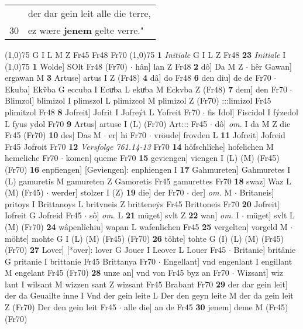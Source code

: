 \documentclass[8pt,a4paper,notitlepage]{article}
\begin{document}
\begin{table}[ht]
\begin{minipage}[t]{0.5\linewidth}
\begin{tabular}{rl}
 & der dar gein leit alle die terre,\\ 
30 & ez wære \textbf{jenem} gelte verre."\\ 
\end{tabular}
\scriptsize
\line(1,0){75} \newline
G I L M Z Fr45 Fr48 Fr70 \newline
\line(1,0){75} \newline
\textbf{1} \textit{Initiale} G I L Z Fr48  \textbf{23} \textit{Initiale} I  \newline
\line(1,0){75} \newline
\textbf{1} Wolde] SOlt Fr48 (Fr70)  $\cdot$ hân] lan Z Fr48 \textbf{2} dô] Da M Z  $\cdot$ hêr Gawan] ergawan M \textbf{3} Artuse] artus I Z (Fr48) \textbf{4} dâ] do Fr48 \textbf{6} den diu] de de Fr70  $\cdot$ Ekuba] Ekv̂ba G eccuba I Ecuͯba L ekuͯba M Eckvba Z (Fr48) \textbf{7} dem] den Fr70  $\cdot$ Blimzol] blimizol I plimszol L plimizcol M plimizol Z (Fr70) :::limizol Fr45 plimitzol Fr48 \textbf{8} Jofreit] Jofrit I Jofreýt L Yofreit Fr70  $\cdot$ fis Idol] Fiscidol I fýzedol L fyus ydol Fr70 \textbf{9} Artus] artuse I (L) (Fr70) Art::: Fr45  $\cdot$ dô] \textit{om.} I da M Z die Fr45 (Fr70) \textbf{10} des] Das M  $\cdot$ er] hi Fr70  $\cdot$ vröude] frovden L \textbf{11} Jofreit] Jofreid Fr45 Jofroit Fr70 \textbf{12} \textit{Versfolge 761.14-13} Fr70  \textbf{14} höfschlîche] hofelichen M hemeliche Fr70  $\cdot$ komen] queme Fr70 \textbf{15} geviengen] viengen I (L) (M) (Fr45) (Fr70) \textbf{16} enpfiengen] [Geviengen]: enphiengen I \textbf{17} Gahmureten] Gahmuretes I (L) gamuretis M gamureten Z Gamoretis Fr45 gamurettes Fr70 \textbf{18} swaz] Waz L (M) (Fr45)  $\cdot$ werder] stolzer I (Z) \textbf{19} die] der Fr70  $\cdot$ der] \textit{om.} M  $\cdot$ Britaneis] pritoys I Brittanoys L britvneis Z britteneẏs Fr45 Brittoneis Fr70 \textbf{20} Jofreit] Iofreit G Jofreid Fr45  $\cdot$ sô] \textit{om.} L \textbf{21} müget] svlt Z \textbf{22} wan] \textit{om.} I  $\cdot$ müget] svlt L (M) (Fr70) \textbf{24} wâpenlîchiu] wapan L wafenlichen Fr45 \textbf{25} vergelten] vorgeld M  $\cdot$ möhte] mohte G I (L) (M) (Fr45) (Fr70) \textbf{26} töhte] tohte G (I) (L) (M) (Fr45) (Fr70) \textbf{27} Lover] [*over]: lover G Jouer I Leover L Louer Fr45  $\cdot$ Britanie] britânie G pritanie I brittanie Fr45 Brittanya Fr70  $\cdot$ Engellant] vnd engenlant I engillant M engelant Fr45 (Fr70) \textbf{28} unze an] vnd von Fr45 byz an Fr70  $\cdot$ Wizsant] wiz lant I wilsant M wizzen sant Z wizsant Fr45 Brabant Fr70 \textbf{29} der dar gein leit] der da Geuailte inne I Vnd der gein leite L Der den geyn leite M der da gein leit Z (Fr70) Der den gein leit Fr45  $\cdot$ alle die] an de Fr45 \textbf{30} jenem] deme M (Fr45) (Fr70) \newline

\end{minipage}
\end{table}
\end{document}
